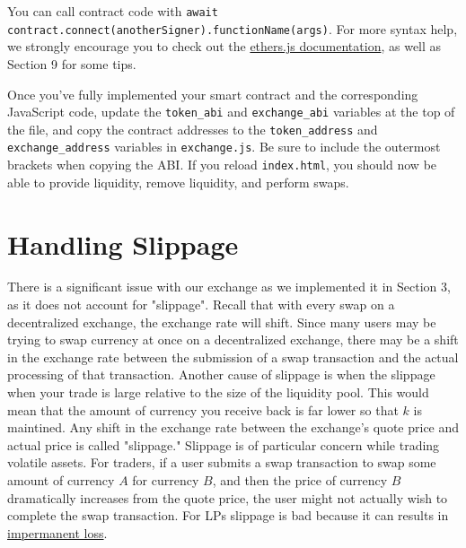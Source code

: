 \documentclass[11pt]{article}
\begin{document}
You can call contract code with \texttt{await contract.connect(anotherSigner).functionName(args)}. For more syntax help, we strongly encourage you to check out the \hyperlink{https://docs.ethers.io/v5/getting-started/}{ethers.js documentation}, as well as Section 9 for some tips.


Once you've fully implemented your smart contract and the corresponding JavaScript code, update the \texttt{token\_abi} and \texttt{exchange\_abi} variables at the top of the file, and copy the contract addresses to the \texttt{token\_address} and \texttt{exchange\_address} variables in \texttt{exchange.js}. Be sure to include the outermost brackets when copying the ABI. If you reload \texttt{index.html}, you should now be able to provide liquidity, remove liquidity, and perform swaps.

 
\section{Handling Slippage}

There is a significant issue with our exchange as we implemented it in Section 3, as it does not account for "slippage". Recall that with every swap on a decentralized exchange, the exchange rate will shift. Since many users may be trying to swap currency at once on a decentralized exchange, there may be a shift in the exchange rate between the submission of a swap transaction and the actual processing of that transaction. Another cause of slippage is when the slippage when your trade is large relative to the size of the liquidity pool. This would mean that the amount of currency you receive back is far lower so that $k$ is maintined. Any shift in the exchange rate between the exchange's quote price and actual price is called "slippage." Slippage is of particular concern while trading volatile assets. For traders, if a user submits a swap transaction to swap some amount of currency $A$ for currency $B$, and then the price of currency $B$ dramatically increases from the quote price, the user might not actually wish to complete the swap transaction. For LPs slippage is bad because it can results in \href{https://finematics.com/impermanent-loss-explained/}{impermanent loss}.
\end{document}
